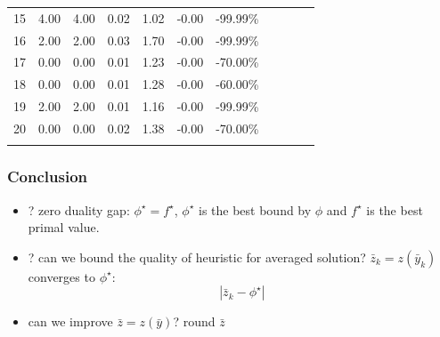 \begin{frame}
\begin{tabular}{lllrrrlllll}
    15 & 4.00    & 4.00                   & 0.02                    & 1.02 & -0.00 & -99.99\%  \\
    16 & 2.00    & 2.00                   & 0.03                    & 1.70 & -0.00 & -99.99\%  \\
    17 & 0.00    & 0.00                   & 0.01                    & 1.23 & -0.00 & -70.00\%  \\
    18 & 0.00    & 0.00                   & 0.01                    & 1.28 & -0.00 & -60.00\%  \\
    19 & 2.00    & 2.00                   & 0.01                    & 1.16 & -0.00 & -99.99\%  \\
    20 & 0.00    & 0.00                   & 0.02                    & 1.38 & -0.00 & -70.00\%  \\
    \bottomrule
    \normalsize
  \end{tabular}
\end{frame}

\begin{frame}
  \frametitle{Conclusion}

  \begin{itemize}
    \item ? zero duality gap: \(\phi^\star = f^\star\), \(\phi^\star\) is the best bound by \(\phi\) and \( f^\star\) is the best primal value.
    \item ? can we bound the quality of heuristic for averaged solution? \(\bar z_k = z(\bar y_k)\) converges to \(\phi^\star\):
          \[|\bar z_k - \phi^\star| \]
    \item can we improve \(\bar z = z(\bar y)\)? round \(\bar z\)
  \end{itemize}
\end{frame}


